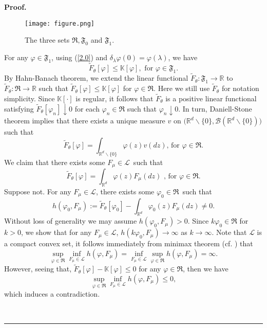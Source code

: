 \documentclass[a4paper,oneside,10pt]{article}%
\newenvironment{proof}[1][Proof]{\noindent \textbf{#1.} }{\  \rule{0.5em}{0.5em}}
\numberwithin{equation}{section}
\begin{document}
\begin{proof}
\begin{figure}[h]
\caption{The three sets $\mathfrak{R},\mathfrak{F}_{0}$ and $\mathfrak{F}_{1}%
$.}%
\centering
\texttt{[image: figure.png]}\end{figure}

For any $\varphi \in \mathfrak{F}_{1}$, using (\ref{2.0}) and $\delta_{\lambda
}\varphi(0)=\varphi(\lambda)$, we have
\[
\tilde{F}_{\theta}[\varphi]\leq \mathbb{K}[\varphi],\text{ for }\varphi
\in \mathfrak{F}_{1}.
\]
By Hahn-Banach theorem, we extend the linear functional $\tilde{F}_{\theta
}:\mathfrak{F}_{1}\rightarrow \mathbb{R}$ to $\tilde{F}_{\theta}:
\mathfrak{R}\rightarrow \mathbb{R}$ such that $\tilde{F}_{\theta}[\varphi]
\leq \mathbb{K}[\varphi]$ for $\varphi \in \mathfrak{R}$. Here we still use
$\tilde{F}_{\theta}$ for notation simplicity. Since $\mathbb{K}[\cdot]$ is
regular, it follows that
$\tilde{F}_{\theta}$ is a positive linear functional satisfying $\tilde
{F}_{\theta}[\varphi_{n}]\downarrow0$ for each $\varphi_{n}\in \mathfrak{R}$
such that $\varphi_{n}\downarrow0$. In turn, Daniell-Stone theorem implies
that there exists a unique measure $v$ on $\big(\mathbb{R}^{d}\backslash
\{0\},\mathcal{B}(\mathbb{R}^{d}\backslash \{0\})\big)$ such that
\[
\tilde{F}_{\theta}[\varphi]=\int_{\mathbb{R}^{d}\backslash \{0\}}%
\varphi(z)v(dz)\text{, for }\varphi \in \mathfrak{R}.
\]
We claim that there exists some $F_{\mu}\in \mathcal{L}$\ such that
\begin{equation}
\tilde{F}_{\theta}[\varphi]=\int_{\mathbb{R}^{d}}\varphi(z)F_{\mu}(dz)\text{ ,
for }\varphi \in \mathfrak{R}. \label{2.3}%
\end{equation}
Suppose not. For any $F_{\mu}\in \mathcal{L}$, there exists some $\varphi
_{0}\in \mathfrak{R}$\ such that
\[
h(\varphi_{0},F_{\mu}):=\tilde{F}_{\theta}[\varphi_{0}]-\int_{\mathbb{R} ^{d}%
}\varphi_{0}(z)F_{\mu}(dz)\neq0.
\]
Without loss of generality we may assume $h(\varphi_{0},F_{\mu})>0$. Since
$k\varphi_{0}\in \mathfrak{R}$ for $k>0$, we show that for any $F_{\mu}%
\in \mathcal{L}$, $h(k\varphi_{0},F_{\mu})\rightarrow \infty$ as $k\rightarrow
\infty$. Note that $\mathcal{L}$ is a compact convex set, it follows
immediately from minimax theorem (cf. \cite{Fan1953,Sion1958}) that
\[
\sup_{\varphi \in \mathfrak{R}}\inf_{F_{\mu}\in \mathcal{L}}h(\varphi,F_{\mu
})=\inf_{F_{\mu}\in \mathcal{L}}\sup_{\varphi \in \mathfrak{R}}h(\varphi,F_{\mu
})=\infty.
\]
However, seeing that, $\tilde{F}_{\theta}[\varphi]-\mathbb{K}[\varphi]\leq0$
for any $\varphi \in \mathfrak{R}$, then we have
\[
\sup_{\varphi \in \mathfrak{R}}\inf_{F_{\mu}\in \mathcal{L}}h(\varphi,F_{\mu
})\leq0,
\]
which induces a contradiction.


\end{proof}
\end{document}
